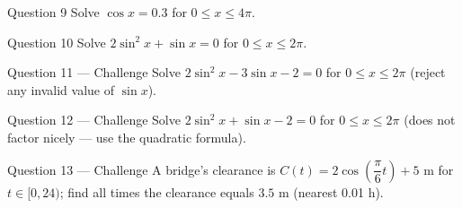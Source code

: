 \documentclass[11pt]{article}
\begin{document}
\begin{qbox}{Question 9}
Solve $\cos x=0.3$ for $0\leq x\leq4\pi$.\workspace{2.4cm}
\end{qbox}

\begin{qbox}{Question 10}
Solve $2\sin^2x+\sin x=0$ for $0\leq x\leq2\pi$.\workspace{2.4cm}
\end{qbox}

\begin{qbox}{Question 11 --- Challenge}
Solve $2\sin^2x-3\sin x-2=0$ for $0\leq x\leq2\pi$ (reject any invalid value of $\sin x$).\workspace{3.2cm}
\end{qbox}

\begin{qbox}{Question 12 --- Challenge}
Solve $2\sin^2x+\sin x-2=0$ for $0\leq x\leq2\pi$ (does not factor nicely --- use the quadratic formula).\workspace{3.4cm}
\end{qbox}

\begin{qbox}{Question 13 --- Challenge}
A bridge's clearance is $C(t)=2\cos\!\left(\dfrac{\pi}6t\right)+5$ m for $t\in[0,24)$; find all times the clearance equals $3.5$ m (nearest 0.01 h).\workspace{3.4cm}
\end{qbox}

\clearpage
{}
\end{document}
